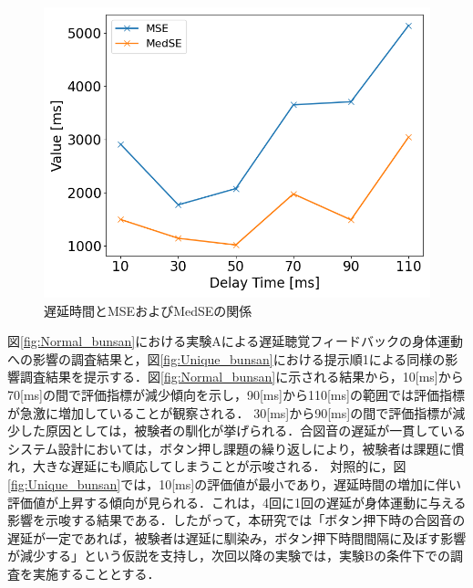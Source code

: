 \begin{figure}[bt]
  \centering
  \includegraphics[scale=0.5]{figures/Yobi/Var/MSE_MedSE.png}
  \caption{遅延時間とMSEおよびMedSEの関係}
  \label{fig:Yobi_MSE_MedSE}
\end{figure}
図\ref{fig:Normal_bunsan}における実験Aによる遅延聴覚フィードバックの身体運動への影響の調査結果と，図\ref{fig:Unique_bunsan}における提示順1による同様の影響調査結果を提示する．図\ref{fig:Normal_bunsan}に示される結果から，10[ms]から70[ms]の間で評価指標が減少傾向を示し，90[ms]から110[ms]の範囲では評価指標が急激に増加していることが観察される．
30[ms]から90[ms]の間で評価指標が減少した原因としては，被験者の馴化が挙げられる．合図音の遅延が一貫しているシステム設計においては，ボタン押し課題の繰り返しにより，被験者は課題に慣れ，大きな遅延にも順応してしまうことが示唆される．
対照的に，図\ref{fig:Unique_bunsan}では，10[ms]の評価値が最小であり，遅延時間の増加に伴い評価値が上昇する傾向が見られる．これは，4回に1回の遅延が身体運動に与える影響を示唆する結果である．したがって，本研究では「ボタン押下時の合図音の遅延が一定であれば，被験者は遅延に馴染み，ボタン押下時間間隔に及ぼす影響が減少する」という仮説を支持し，次回以降の実験では，実験Bの条件下での調査を実施することとする．

\newpage \newpage
